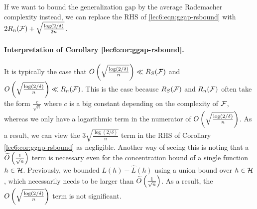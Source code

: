 \begin{remark}
If we want to bound the generalization gap by the average Rademacher complexity instead, we can replace the RHS of \eqref{lec6:eqn:ggap-rsbound} with $2R_n(\mathcal F) + \sqrt{\frac{\log(2/\delta)}{2n}}$.
\end{remark}

\paragraph{Interpretation of  Corollary \ref{lec6:cor:ggap-rsbound}.}
\sloppy It is typically the case that $O\left(\sqrt{\frac{\log (2/\delta)}{n}}\right) \ll R_S(\mathcal F)$ and $O\left(\sqrt{\frac{\log (2/\delta)}{n}}\right) \ll R_n(\mathcal F)$. This is the case because $R_S(\mathcal F)$ and $R_n(\mathcal F)$ often take the form $\frac{c}{\sqrt{n}}$ where $c$ is a big constant depending on the complexity of $\mathcal F$, whereas we only have a logarithmic term in the numerator of $O\left(\sqrt{\frac{\log (2/\delta)}{n}}\right)$. As a result, we can view the $3\sqrt{\frac{\log (2/\delta)}{n}}$ term in the RHS of Corollary \ref{lec6:cor:ggap-rsbound} as negligible. Another way of seeing this is noting that a $\widetilde{O} \left( \frac{1}{\sqrt{n}} \right)$ term is necessary even for the concentration bound of a single function $h\in\mathcal H$. Previously, we bounded $L(h)-\hat{L}(h)$ using a union bound over $h\in\mathcal H$, which necessarily needs to be larger than $\widetilde{O} \left(\frac{1}{\sqrt{n}} \right)$. As a result, the $O\left(\sqrt{\frac{\log (2/\delta)}{n}}\right)$ term is not significant.

%




